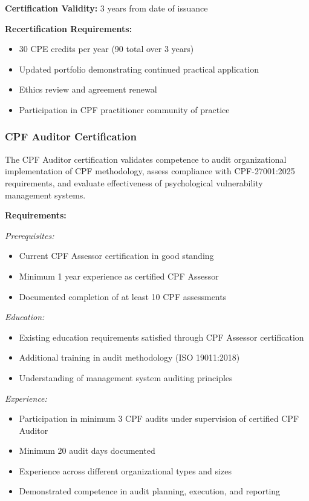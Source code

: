 \documentclass[11pt,a4paper]{article}
\begin{document}
\textbf{Certification Validity:} 3 years from date of issuance

\textbf{Recertification Requirements:}
\begin{itemize}
\item 30 CPE credits per year (90 total over 3 years)
\item Updated portfolio demonstrating continued practical application
\item Ethics review and agreement renewal
\item Participation in CPF practitioner community of practice
\end{itemize}

\subsubsection{CPF Auditor Certification}

The CPF Auditor certification validates competence to audit organizational implementation of CPF methodology, assess compliance with CPF-27001:2025 requirements, and evaluate effectiveness of psychological vulnerability management systems.

\textbf{Requirements:}

\textit{Prerequisites:}
\begin{itemize}
\item Current CPF Assessor certification in good standing
\item Minimum 1 year experience as certified CPF Assessor
\item Documented completion of at least 10 CPF assessments
\end{itemize}

\textit{Education:}
\begin{itemize}
\item Existing education requirements satisfied through CPF Assessor certification
\item Additional training in audit methodology (ISO 19011:2018)
\item Understanding of management system auditing principles
\end{itemize}

\textit{Experience:}
\begin{itemize}
\item Participation in minimum 3 CPF audits under supervision of certified CPF Auditor
\item Minimum 20 audit days documented
\item Experience across different organizational types and sizes
\item Demonstrated competence in audit planning, execution, and reporting
\end{itemize}
\end{document}
